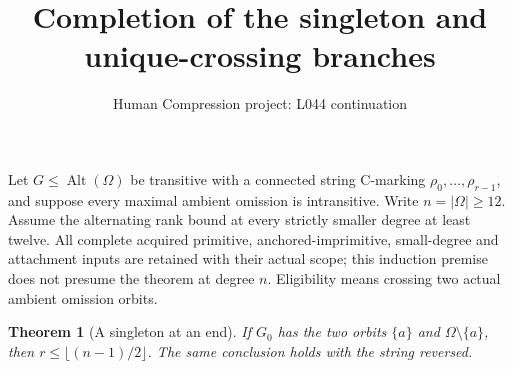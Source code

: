 \documentclass[11pt,a4paper]{article}
\title{Completion of the singleton and unique-crossing branches}
\author{Human Compression project: L044 continuation}
\date{}
\newtheorem{theorem}{Theorem}
\begin{document}
\maketitle
Let $G\le\operatorname{Alt}(\Omega)$ be transitive with a connected
string C-marking $\rho_0,\ldots,\rho_{r-1}$, and suppose every
maximal ambient omission is intransitive. Write $n=|\Omega|\ge12$.
Assume the alternating rank bound at every strictly smaller degree
at least twelve. All complete acquired primitive, anchored-imprimitive,
small-degree and attachment inputs are retained with their actual
scope; this induction premise does not presume the theorem at degree $n$.
Eligibility means crossing two actual ambient omission orbits.

\begin{theorem}[A singleton at an end]\label{singleton}
If $G_0$ has the two orbits $\{a\}$ and
$\Omega\setminus\{a\}$, then
$r\le\lfloor(n-1)/2\rfloor$.
The same conclusion holds with the string reversed.
\end{theorem}
\end{document}
